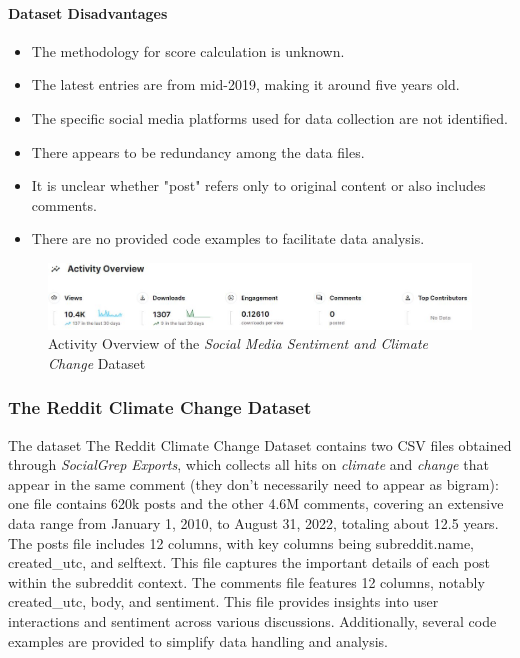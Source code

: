 \paragraph{Dataset Disadvantages}
\begin{itemize}
    \item The methodology for score calculation is unknown.
    \item The latest entries are from mid-2019, making it around five years old.
    \item The specific social media platforms used for data collection are not identified.
    \item There appears to be redundancy among the data files.
    \item It is unclear whether "post" refers only to original content or also includes comments.
    \item There are no provided code examples to facilitate data analysis.
\end{itemize}

\begin{figure}[h]
    \includegraphics[width=\textwidth]{images/dataset/ds_4_activity.JPG}
    \caption{Activity Overview of the \emph{Social Media Sentiment and Climate Change} Dataset\protect\footnotemark}
    \label{fig:ds_4_activity}
\end{figure}

\subsubsection{The Reddit Climate Change Dataset}
The dataset The Reddit Climate Change Dataset \cite{TheRedditClimateChangeDataset} contains two CSV files obtained through \emph{SocialGrep Exports}, which collects all hits on \emph{climate} and \emph{change} that appear in the same comment (they don't necessarily need to appear as bigram): one file contains 620k posts and the other 4.6M comments, covering an extensive data range from January 1, 2010, to August 31, 2022, totaling about 12.5 years. The posts file includes 12 columns, with key columns being subreddit.name, created\_utc, and selftext. This file captures the important details of each post within the subreddit context. The comments file features 12 columns, notably created\_utc, body, and sentiment. This file provides insights into user interactions and sentiment across various discussions. Additionally, several code examples are provided to simplify data handling and analysis.
 
